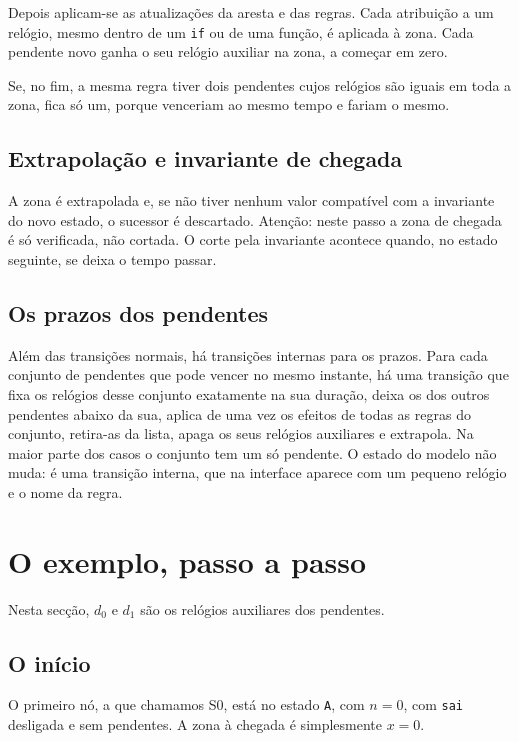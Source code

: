 \documentclass[11pt,a4paper]{article}
\newcommand{\code}[1]{\texttt{#1}}
\begin{document}
Depois aplicam-se as atualizações da aresta e das regras. Cada atribuição a um relógio, mesmo dentro de um \code{if} ou de uma função, é aplicada à zona. Cada pendente novo ganha o seu relógio auxiliar na zona, a começar em zero.

Se, no fim, a mesma regra tiver dois pendentes cujos relógios são iguais em toda a zona, fica só um, porque venceriam ao mesmo tempo e fariam o mesmo.

\subsection{Extrapolação e invariante de chegada}

A zona é extrapolada e, se não tiver nenhum valor compatível com a invariante do novo estado, o sucessor é descartado. Atenção: neste passo a zona de chegada é só verificada, não cortada. O corte pela invariante acontece quando, no estado seguinte, se deixa o tempo passar.

\subsection{Os prazos dos pendentes}

Além das transições normais, há transições internas para os prazos. Para cada conjunto de pendentes que pode vencer no mesmo instante, há uma transição que fixa os relógios desse conjunto exatamente na sua duração, deixa os dos outros pendentes abaixo da sua, aplica de uma vez os efeitos de todas as regras do conjunto, retira-as da lista, apaga os seus relógios auxiliares e extrapola. Na maior parte dos casos o conjunto tem um só pendente. O estado do modelo não muda: é uma transição interna, que na interface aparece com um pequeno relógio e o nome da regra.

\section{O exemplo, passo a passo}

Nesta secção, \(d_0\) e \(d_1\) são os relógios auxiliares dos pendentes.

\subsection{O início}

O primeiro nó, a que chamamos S0, está no estado \code{A}, com \(n = 0\), com \code{sai} desligada e sem pendentes. A zona à chegada é simplesmente \(x = 0\).
\end{document}
